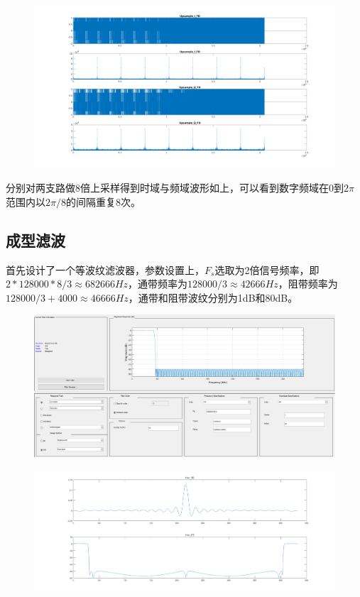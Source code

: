 \begin{spacing}{1.5}
\begin{figure}[H]
\centering
\includegraphics[width = \columnwidth]{upsample.png}
\end{figure}

分别对两支路做8倍上采样得到时域与频域波形如上，可以看到数字频域在0到$2\pi$范围内以$2\pi/8$的间隔重复8次。

\subsection{成型滤波}

首先设计了一个等波纹滤波器，参数设置上，$F_s$选取为2倍信号频率，即$2 * 128000 * 8 / 3 \approx 682666 Hz$，通带频率为$128000 / 3 \approx 42666 Hz$，阻带频率为$128000 / 3 + 4000 \approx  46666 Hz$，通带和阻带波纹分别为1dB和80dB。

\begin{figure}[H]
\centering
\includegraphics[width = 0.8\columnwidth]{filterparam.png}
\end{figure}

\begin{figure}[H]
\centering
\includegraphics[width = \columnwidth]{filter.png}
\end{figure}


\end{spacing}
